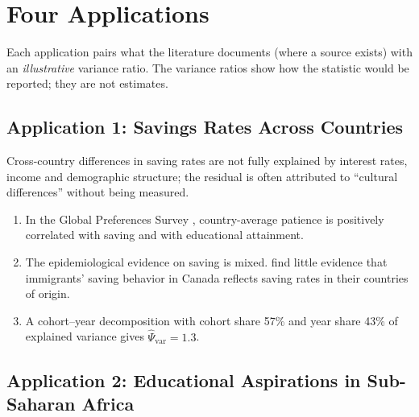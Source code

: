 \documentclass[../structural_economics_book.tex]{subfiles}
\begin{document}
\section{Four Applications}
\label{ch11:sec:applications}

Each application pairs what the literature documents (where a source exists) with an \textit{illustrative} variance ratio. The variance ratios show how the statistic would be reported; they are not estimates.

\subsection{Application 1: Savings Rates Across Countries}

Cross-country differences in saving rates are not fully explained by interest rates, income and demographic structure; the residual is often attributed to ``cultural differences'' without being measured.

\begin{stylizedfact}\label{ch11:prop:savings}
\leavevmode
\begin{enumerate}
\item In the Global Preferences Survey \citep[\textit{QJE}]{falk2018global}, country-average patience is positively correlated with saving and with educational attainment.
\item The epidemiological evidence on saving is mixed. \citet[\textit{QJE}]{carroll1994there} find little evidence that immigrants' saving behavior in Canada reflects saving rates in their countries of origin.
\item \textup{\illustrative} A cohort--year decomposition with cohort share 57\% and year share 43\% of explained variance gives $\hat{\Psi}_{\text{var}} = 1.3$.
\end{enumerate}
\end{stylizedfact}


\subsection{Application 2: Educational Aspirations in Sub-Saharan Africa}
\end{document}
